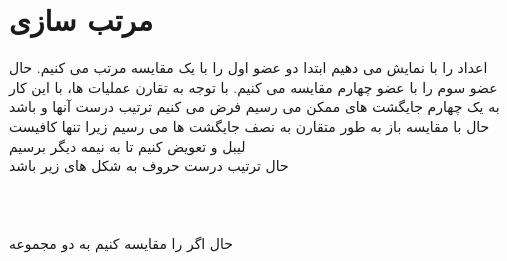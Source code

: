 \documentclass[a4paper]{article}
\begin{document}
\newpage

\section*{مرتب سازی}	
اعداد را با
نمایش  می دهیم
ابتدا دو عضو اول را با یک مقایسه مرتب می کنیم.
حال عضو سوم را با عضو چهارم مقایسه می کنیم.
با توجه به تقارن عملیات ها، با این کار به یک چهارم جایگشت های ممکن می رسیم
فرض می کنیم ترتیب درست آنها
و
باشد\\
حال با مقایسه
باز به طور متقارن به نصف جایگشت ها می رسیم زیرا تنها کافیست لیبل
و
تعویض کنیم تا به نیمه دیگر برسیم\\
حال ترتیب درست حروف به شکل های زیر باشد\\
\\
\\
\\
حال اگر
را مقایسه کنیم
به دو مجموعه
\end{document}
